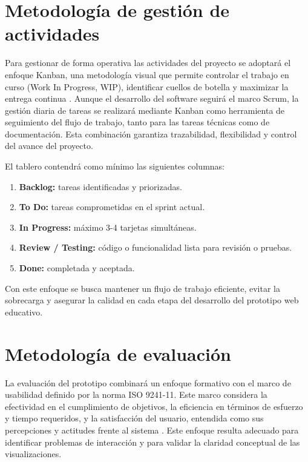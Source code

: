 \section{Metodología de gestión de actividades}

Para gestionar de forma operativa las actividades del proyecto se adoptará el enfoque Kanban, una metodología visual que permite controlar el trabajo en curso (Work In Progress, WIP), identificar cuellos de botella y maximizar la entrega continua \cite{KanbanScrum2010}. Aunque el desarrollo del software seguirá el marco Scrum, la gestión diaria de tareas se realizará mediante Kanban como herramienta de seguimiento del flujo de trabajo, tanto para las tareas técnicas como de documentación. Esta combinación garantiza trazabilidad, flexibilidad y control del avance del proyecto.

El tablero contendrá como mínimo las siguientes columnas:

\begin{enumerate}
    \item \textbf{Backlog:} tareas identificadas y priorizadas.
    \item \textbf{To Do:} tareas comprometidas en el sprint actual.
    \item \textbf{In Progress:} máximo 3-4 tarjetas simultáneas.
    \item \textbf{Review / Testing:} código o funcionalidad lista para revisión o pruebas.
    \item \textbf{Done:} completada y aceptada.
\end{enumerate}

Con este enfoque se busca mantener un flujo de trabajo eficiente, evitar la sobrecarga y asegurar la calidad en cada etapa del desarrollo del prototipo web educativo.

\section{Metodología de evaluación}

La evaluación del prototipo combinará un enfoque formativo con el marco de usabilidad definido por la norma ISO 9241-11. Este marco considera la efectividad en el cumplimiento de objetivos, la eficiencia en términos de esfuerzo y tiempo requeridos, y la satisfacción del usuario, entendida como sus percepciones y actitudes frente al sistema \cite{pailiacho2022usabilidad}. Este enfoque resulta adecuado para identificar problemas de interacción y para validar la claridad conceptual de las visualizaciones.

